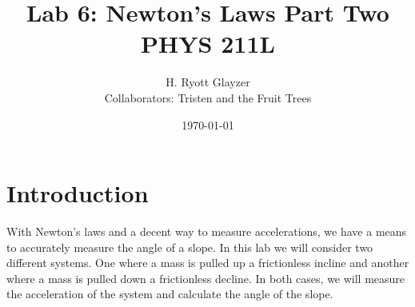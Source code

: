 \documentclass[hidelinks, 12pt, letterpaper]{article}
\title{\textbf{Lab 6:  Newton's Laws Part Two}\\PHYS 211L}
\author{H. Ryott Glayzer\\Collaborators: Tristen and the Fruit Trees}
\date{\today}
\begin{document}
\hypersetup{bookmarksnumbered=true,}

\maketitle

\begin{Large}
\tableofcontents
\end{Large}%
\pagebreak

\section{Introduction}
With Newton’s laws and a decent way to measure accelerations, we have a means to
accurately measure the angle of a slope. In this lab we will consider two different
systems. One where a mass is pulled up a frictionless incline and another where a mass
is pulled down a frictionless decline. In both cases, we will measure the acceleration of
the system and calculate the angle of the slope.
\end{document}
